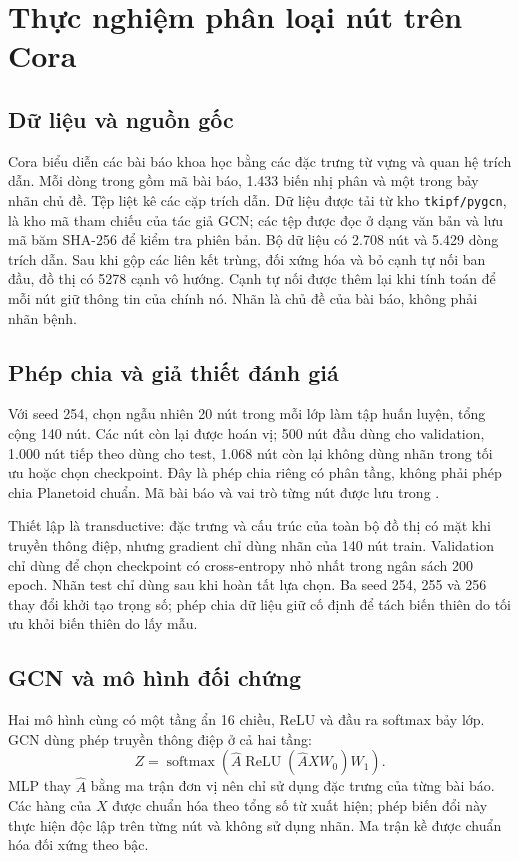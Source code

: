 \section{Thực nghiệm phân loại nút trên Cora}
\subsection{Dữ liệu và nguồn gốc}
Cora biểu diễn các bài báo khoa học bằng các đặc trưng từ vựng và quan hệ trích dẫn. Mỗi dòng trong  gồm mã bài báo, 1.433 biến nhị phân và một trong bảy nhãn chủ đề. Tệp  liệt kê các cặp trích dẫn. Dữ liệu được tải từ kho \texttt{tkipf/pygcn}, là kho mã tham chiếu của tác giả GCN; các tệp được đọc ở dạng văn bản và lưu mã băm SHA-256 để kiểm tra phiên bản.
Bộ dữ liệu có 2.708 nút và 5.429 dòng trích dẫn. Sau khi gộp các liên kết trùng, đối xứng hóa và bỏ cạnh tự nối ban đầu, đồ thị có 5278 cạnh vô hướng. Cạnh tự nối được thêm lại khi tính toán để mỗi nút giữ thông tin của chính nó. Nhãn là chủ đề của bài báo, không phải nhãn bệnh.

\subsection{Phép chia và giả thiết đánh giá}
Với seed 254, chọn ngẫu nhiên 20 nút trong mỗi lớp làm tập huấn luyện, tổng cộng 140 nút. Các nút còn lại được hoán vị; 500 nút đầu dùng cho validation, 1.000 nút tiếp theo dùng cho test, 1.068 nút còn lại không dùng nhãn trong tối ưu hoặc chọn checkpoint. Đây là phép chia riêng có phân tầng, không phải phép chia Planetoid chuẩn. Mã bài báo và vai trò từng nút được lưu trong .

Thiết lập là transductive: đặc trưng và cấu trúc của toàn bộ đồ thị có mặt khi truyền thông điệp, nhưng gradient chỉ dùng nhãn của 140 nút train. Validation chỉ dùng để chọn checkpoint có cross-entropy nhỏ nhất trong ngân sách 200 epoch. Nhãn test chỉ dùng sau khi hoàn tất lựa chọn. Ba seed 254, 255 và 256 thay đổi khởi tạo trọng số; phép chia dữ liệu giữ cố định để tách biến thiên do tối ưu khỏi biến thiên do lấy mẫu.

\subsection{GCN và mô hình đối chứng}
Hai mô hình cùng có một tầng ẩn 16 chiều, ReLU và đầu ra softmax bảy lớp. GCN dùng phép truyền thông điệp ở cả hai tầng:
\[
Z=\operatorname{softmax}\left(\widehat A\operatorname{ReLU}(\widehat A XW_0)W_1\right).
\]
MLP thay $\widehat A$ bằng ma trận đơn vị nên chỉ sử dụng đặc trưng của từng bài báo. Các hàng của $X$ được chuẩn hóa theo tổng số từ xuất hiện; phép biến đổi này thực hiện độc lập trên từng nút và không sử dụng nhãn. Ma trận kề được chuẩn hóa đối xứng theo bậc.

